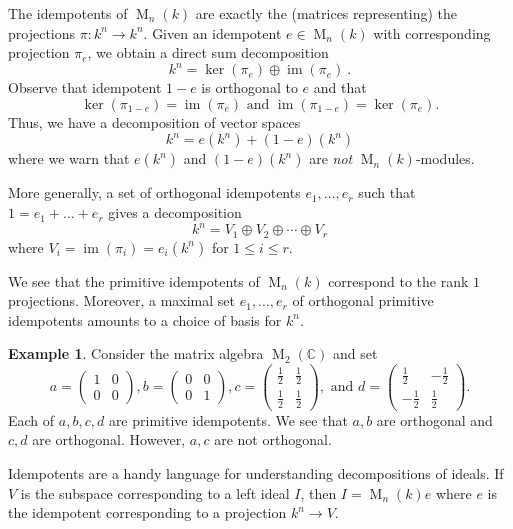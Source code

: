 \documentclass[12pt]{article}
\theoremstyle{plain}
\theoremstyle{definition}
\newtheorem{example}[theorem]{Example}
\theoremstyle{remark}
\numberwithin{equation}{section}
\begin{document}
The idempotents of $\operatorname{M}_n(k)$ are exactly the (matrices
representing) the projections $\pi : k^n \to k^n$.
Given an idempotent $e \in \operatorname{M}_n(k)$ with corresponding
projection $\pi_e$, we obtain a direct sum decomposition
\[
k^n = \ker(\pi_e) \oplus \operatorname{im}(\pi_e)
\ .
\]
Observe that idempotent $1-e$ is orthogonal to $e$ and that
\[
\ker(\pi_{1-e}) = \operatorname{im}(\pi_{e})
\textrm{ and }
\operatorname{im}(\pi_{1-e}) = \ker(\pi_e).
\]
Thus, we have a decomposition of vector spaces
\[
k^n = e(k^n) + (1-e)(k^n)
\]
where we warn that $e(k^n)$ and $(1-e)(k^n)$ are \emph{not}
$\operatorname{M}_n(k)$-modules.

More generally, a set of orthogonal idempotents $e_1,\ldots,e_r$
such that $1=e_1+\ldots+e_r$ gives a decomposition
\[
k^n = V_1 \oplus V_2 \oplus \cdots \oplus V_r
\]
where $V_i = \operatorname{im}(\pi_i) = e_i(k^n)$ for $1 \le i \le r$.

We see that the primitive idempotents of $\operatorname{M}_n(k)$
correspond to the rank $1$ projections.
Moreover, a maximal set $e_1,\ldots,e_r$ of orthogonal primitive
idempotents amounts to a choice of basis for $k^n$.

\begin{example}
Consider the matrix algebra $\operatorname{M}_2(\mathbb{C})$
and set
\[
a = \begin{pmatrix} 1 & 0 \\ 0 & 0 \end{pmatrix},
b = \begin{pmatrix} 0 & 0 \\ 0 & 1 \end{pmatrix},
c = \begin{pmatrix} \frac{1}{2} & \frac{1}{2} \\ \frac{1}{2} & \frac{1}{2} \end{pmatrix},
\textrm{ and }
d = \begin{pmatrix} \frac{1}{2} & -\frac{1}{2} \\ -\frac{1}{2} & \frac{1}{2} \end{pmatrix}.
\]
Each of $a,b,c,d$ are primitive idempotents.
We see that $a,b$ are orthogonal and $c,d$ are orthogonal.
However, $a,c$ are not orthogonal.
\end{example}

Idempotents are a handy language for understanding
decompositions of ideals.
If $V$ is the subspace corresponding to a left ideal $I$,
then $I = \operatorname{M}_n(k)e$ where $e$ is the idempotent
corresponding to a projection $k^n \to V$.
\end{document}
